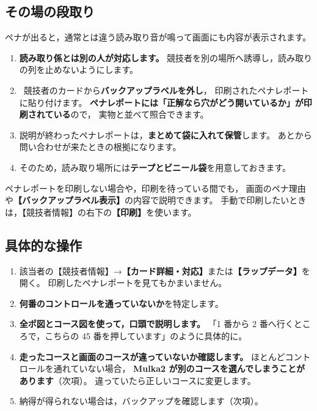 \subsection*{その場の段取り}

ペナが出ると，通常とは違う読み取り音が鳴って画面にも内容が表示されます。

\begin{enumerate}
\item \textbf{読み取り係とは別の人が対応します。}
      競技者を別の場所へ誘導し，読み取りの列を止めないようにします。
\item \tEMIT\ 競技者のカードから\textbf{バックアップラベルを外し}，
      印刷されたペナレポートに貼り付けます。
      \textbf{ペナレポートには「正解なら穴がどう開いているか」が印刷されている}ので，
      実物と並べて照合できます。
\item 説明が終わったペナレポートは，\textbf{まとめて袋に入れて保管}します。
      あとから問い合わせが来たときの根拠になります。
\item そのため，読み取り場所には\textbf{テープとビニール袋}を用意しておきます。
\end{enumerate}

ペナレポートを印刷しない場合や，印刷を待っている間でも，
画面のペナ理由や\textbf{【バックアップラベル表示】}の内容で説明できます。
手動で印刷したいときは，【競技者情報】の右下の\textbf{【印刷】}を使います。


\subsection*{具体的な操作}

\begin{enumerate}
\item 該当者の【競技者情報】→\textbf{【カード詳細・対応】}または\textbf{【ラップデータ】}を開く。
      印刷したペナレポートを見てもかまいません。
\item \textbf{何番のコントロールを通っていないか}を特定します。
\item \textbf{全ポ図とコース図を使って，口頭で説明します。}
      「1 番から 2 番へ行くところで，こちらの 45 番を押しています」のように具体的に。
\item \textbf{走ったコースと画面のコースが違っていないか確認します。}
      ほとんどコントロールを通れていない場合，
      \textbf{Mulka2 が別のコースを選んでしまうことがあります}（次項）。
      違っていたら正しいコースに変更します。
\item 納得が得られない場合は，バックアップを確認します（次項）。
\end{enumerate}

